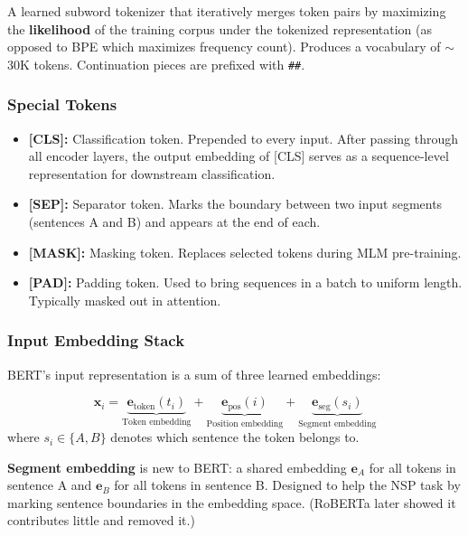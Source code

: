 \documentclass[11pt, a4paper]{article}
\begin{document}
\begin{defbox}
A learned subword tokenizer that iteratively merges token pairs by maximizing the \textbf{likelihood} of the training corpus under the tokenized representation (as opposed to BPE which maximizes frequency count). Produces a vocabulary of $\sim$30K tokens. Continuation pieces are prefixed with \texttt{\#\#}.
\end{defbox}

\subsubsection{Special Tokens}

\begin{itemize}[leftmargin=2em]
  \item \textbf{[CLS]:} Classification token. Prepended to every input. After passing through all encoder layers, the output embedding of [CLS] serves as a sequence-level representation for downstream classification.
  \item \textbf{[SEP]:} Separator token. Marks the boundary between two input segments (sentences A and B) and appears at the end of each.
  \item \textbf{[MASK]:} Masking token. Replaces selected tokens during MLM pre-training.
  \item \textbf{[PAD]:} Padding token. Used to bring sequences in a batch to uniform length. Typically masked out in attention.
\end{itemize}

\subsubsection{Input Embedding Stack}

BERT's input representation is a sum of three learned embeddings:

\begin{mathbox}
\[
\mathbf{x}_i = \underbrace{\mathbf{e}_{\text{token}}(t_i)}_{\text{Token embedding}} + \underbrace{\mathbf{e}_{\text{pos}}(i)}_{\text{Position embedding}} + \underbrace{\mathbf{e}_{\text{seg}}(s_i)}_{\text{Segment embedding}}
\]
where $s_i \in \{A, B\}$ denotes which sentence the token belongs to.
\end{mathbox}

\textbf{Segment embedding} is new to BERT: a shared embedding $\mathbf{e}_A$ for all tokens in sentence A and $\mathbf{e}_B$ for all tokens in sentence B. Designed to help the NSP task by marking sentence boundaries in the embedding space. (RoBERTa later showed it contributes little and removed it.)
\end{document}
